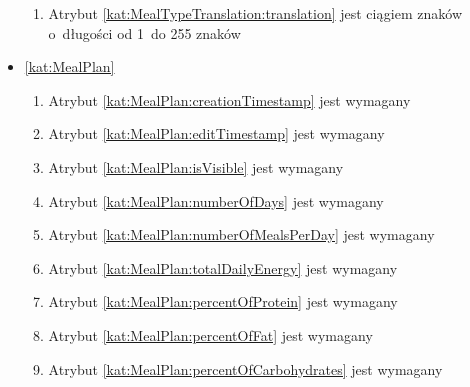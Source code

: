 \begin{itemize}[label={\textbf{Ograniczenia dla}}, wide, labelwidth=!, labelindent=0pt]
\begin{enumerate}[label={\textbf{OGR/\protect\threedigits{\arabic{enumi}}}}, wide, labelwidth=!, align=left, leftmargin=3cm, resume]
        \item Atrybut \ref{kat:MealTypeTranslation:translation} jest ciągiem znaków o~długości od 1~do 255 znaków
    \end{enumerate}

    \item\ref{kat:MealPlan}
    \begin{enumerate}[label={\textbf{OGR/\protect\threedigits{\arabic{enumi}}}}, wide, labelwidth=!, align=left, leftmargin=3cm, resume]
        \item Atrybut \ref{kat:MealPlan:creationTimestamp} jest wymagany
        \item Atrybut \ref{kat:MealPlan:editTimestamp} jest wymagany
        \item Atrybut \ref{kat:MealPlan:isVisible} jest wymagany
        \item Atrybut \ref{kat:MealPlan:numberOfDays}  jest wymagany
        \item Atrybut \ref{kat:MealPlan:numberOfMealsPerDay} jest wymagany
        \item Atrybut \ref{kat:MealPlan:totalDailyEnergy} jest wymagany
        \item Atrybut \ref{kat:MealPlan:percentOfProtein} jest wymagany
        \item Atrybut \ref{kat:MealPlan:percentOfFat} jest wymagany
        \item Atrybut \ref{kat:MealPlan:percentOfCarbohydrates} jest wymagany


\end{enumerate}
\end{itemize}
